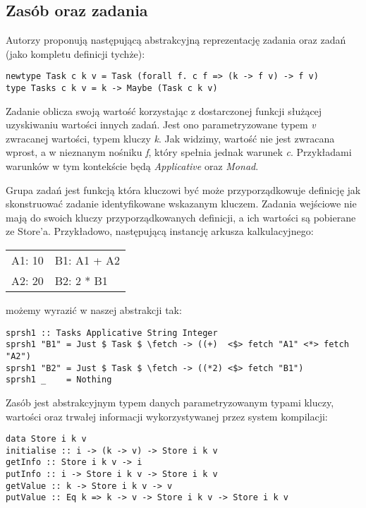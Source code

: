\subsection{Zasób oraz zadania}

\lstset{style=haskell-style}

Autorzy proponują następującą abstrakcyjną reprezentację zadania oraz zadań (jako kompletu definicji tychże):

\begin{lstlisting}
newtype Task c k v = Task (forall f. c f => (k -> f v) -> f v)
type Tasks c k v = k -> Maybe (Task c k v)
\end{lstlisting}

Zadanie oblicza swoją wartość korzystając z dostarczonej funkcji służącej uzyskiwaniu wartości innych zadań. Jest ono parametryzowane typem \textit{v} zwracanej wartości, typem kluczy \textit{k}. Jak widzimy, wartość nie jest zwracana wprost, a w nieznanym nośniku \textit{f}, który spełnia jednak warunek \textit{c}. Przykładami warunków w tym kontekście będą \textit{Applicative} oraz \textit{Monad}.

Grupa zadań jest funkcją która kluczowi być może przyporządkowuje definicję jak skonstruować zadanie identyfikowane wskazanym kluczem. Zadania wejściowe nie mają do swoich kluczy przyporządkowanych definicji, a ich wartości są pobierane ze Store'a. Przykładowo, następującą instancję arkusza kalkulacyjnego:

\begin{tabular}{ l l }
  A1: 10 & B1: A1 + A2 \\
  A2: 20 & B2: 2 * B1
\end{tabular}

możemy wyrazić w naszej abstrakcji tak:

\begin{lstlisting}
sprsh1 :: Tasks Applicative String Integer
sprsh1 "B1" = Just $ Task $ \fetch -> ((+)  <$> fetch "A1" <*> fetch "A2")
sprsh1 "B2" = Just $ Task $ \fetch -> ((*2) <$> fetch "B1")
sprsh1 _    = Nothing
\end{lstlisting}

Zasób jest abstrakcyjnym typem danych parametryzowanym typami kluczy, wartości oraz trwałej informacji wykorzystywanej przez system kompilacji:

\begin{lstlisting}
data Store i k v
initialise :: i -> (k -> v) -> Store i k v
getInfo :: Store i k v -> i
putInfo :: i -> Store i k v -> Store i k v
getValue :: k -> Store i k v -> v
putValue :: Eq k => k -> v -> Store i k v -> Store i k v
\end{lstlisting}


